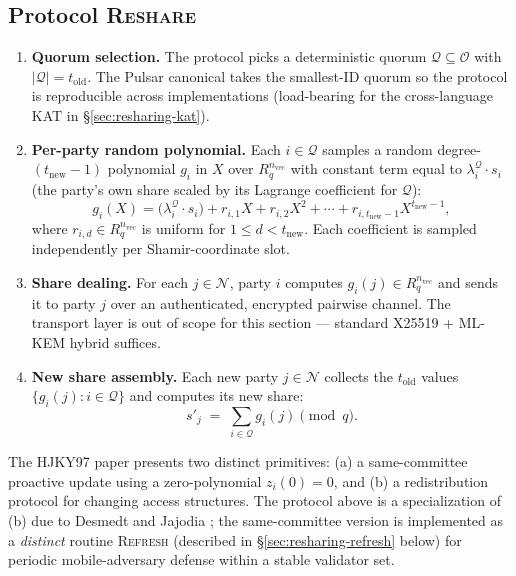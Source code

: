 \subsection{Protocol \textsc{Reshare}}

\begin{enumerate}
\item \textbf{Quorum selection.} The protocol picks a deterministic quorum $\mathcal{Q} \subseteq \mathcal{O}$ with $|\mathcal{Q}| = t_{\mathrm{old}}$. The Pulsar canonical takes the smallest-ID quorum so the protocol is reproducible across implementations (load-bearing for the cross-language KAT in \S\ref{sec:resharing-kat}).

\item \textbf{Per-party random polynomial.} Each $i \in \mathcal{Q}$ samples a random degree-$(t_{\mathrm{new}} - 1)$ polynomial $g_i$ in $X$ over $R_q^{n_{\textrm{vec}}}$ with constant term equal to $\lambda_i^{\mathcal{Q}} \cdot s_i$ (the party's own share scaled by its Lagrange coefficient for $\mathcal{Q}$):
\[
g_i(X) = \bigl(\lambda_i^{\mathcal{Q}} \cdot s_i\bigr) + r_{i,1} X + r_{i,2} X^2 + \cdots + r_{i, t_{\mathrm{new}} - 1} X^{t_{\mathrm{new}} - 1},
\]
where $r_{i,d} \in R_q^{n_{\textrm{vec}}}$ is uniform for $1 \le d < t_{\mathrm{new}}$. Each coefficient is sampled independently per Shamir-coordinate slot.

\item \textbf{Share dealing.} For each $j \in \mathcal{N}$, party $i$ computes $g_i(j) \in R_q^{n_{\textrm{vec}}}$ and sends it to party $j$ over an authenticated, encrypted pairwise channel. The transport layer is out of scope for this section --- standard X25519 + ML-KEM hybrid \cite{lp070} suffices.

\item \textbf{New share assembly.} Each new party $j \in \mathcal{N}$ collects the $t_{\mathrm{old}}$ values $\{g_i(j) : i \in \mathcal{Q}\}$ and computes its new share:
\[
s'_j \;=\; \sum_{i \in \mathcal{Q}} g_i(j) \pmod{q}.
\]
\end{enumerate}

\begin{remark}
The HJKY97 paper presents two distinct primitives: (a) a same-committee proactive update using a zero-polynomial $z_i(0) = 0$, and (b) a redistribution protocol for changing access structures. The protocol above is a specialization of (b) due to Desmedt and Jajodia \cite{desmedt-jajodia97}; the same-committee version is implemented as a \emph{distinct} routine \textsc{Refresh} (described in \S\ref{sec:resharing-refresh} below) for periodic mobile-adversary defense within a stable validator set.
\end{remark}


